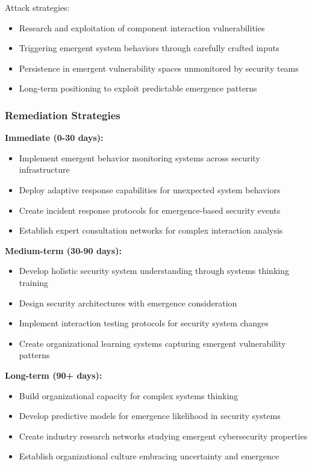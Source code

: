\documentclass[11pt,a4paper]{article}
\begin{document}
Attack strategies:
\begin{itemize}
\item Research and exploitation of component interaction vulnerabilities
\item Triggering emergent system behaviors through carefully crafted inputs
\item Persistence in emergent vulnerability spaces unmonitored by security teams
\item Long-term positioning to exploit predictable emergence patterns
\end{itemize}

\subsubsection{Remediation Strategies}

\textbf{Immediate (0-30 days):}
\begin{itemize}
\item Implement emergent behavior monitoring systems across security infrastructure
\item Deploy adaptive response capabilities for unexpected system behaviors
\item Create incident response protocols for emergence-based security events
\item Establish expert consultation networks for complex interaction analysis
\end{itemize}

\textbf{Medium-term (30-90 days):}
\begin{itemize}
\item Develop holistic security system understanding through systems thinking training
\item Design security architectures with emergence consideration
\item Implement interaction testing protocols for security system changes
\item Create organizational learning systems capturing emergent vulnerability patterns
\end{itemize}

\textbf{Long-term (90+ days):}
\begin{itemize}
\item Build organizational capacity for complex systems thinking
\item Develop predictive models for emergence likelihood in security systems
\item Create industry research networks studying emergent cybersecurity properties
\item Establish organizational culture embracing uncertainty and emergence
\end{itemize}
\end{document}

